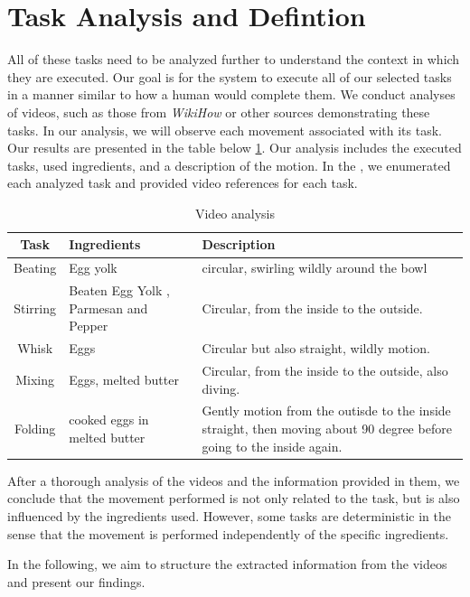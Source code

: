 \section{Task Analysis and Defintion}
\label{sec:task_analysis}
All of these tasks need to be analyzed further to understand the context in which they are executed. 
Our goal is for the system to execute all of our selected tasks in a manner similar to how a human would complete them.
We conduct analyses of videos, such as those from \textit{WikiHow} or other sources demonstrating these tasks. 
In our analysis, we will observe each movement associated with its task.
Our results are presented in the table below \ref{tab:Results}. Our analysis includes the executed tasks, used ingredients, and a description of the motion. In the 
, we enumerated each analyzed task and provided video references for each task.

\begin{table}[H]
\centering
\begin{tabular}{|c|p{}|p{}|}
    \hline
    \textbf{Task} &  \textbf{Ingredients} & \textbf{Description} \\
    \hline
    Beating &  Egg yolk & circular, swirling wildly around the bowl \\
    \hline
    Stirring & Beaten Egg Yolk , Parmesan and Pepper  & Circular, from the inside to the outside. \\
    \hline
    Whisk & Eggs  & Circular but also straight, wildly motion. \\
    \hline
    Mixing &  Eggs, melted butter & Circular, from the inside to the outside, also diving. \\
    \hline
    Folding & cooked eggs in melted butter & Gently motion from the outisde to the inside straight, then moving about 90 degree before going to the inside again. \\
    \hline
  \end{tabular}
\caption{Video analysis}
\label{tab:Results}
\end{table}


After a thorough analysis of the videos and the information provided in them, we conclude that the movement performed is not only related to the task, but is also influenced by the ingredients used. However, 
some tasks are deterministic in the sense that the movement is performed independently of the specific ingredients.

In the following, we aim to structure the extracted information from the videos and present our findings.

